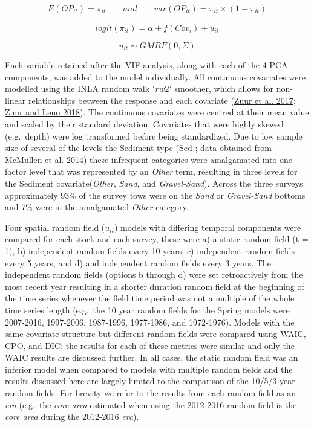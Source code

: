 \documentclass[
]{article}
\begin{document}
\begin{align}
E(OP_{it}) = \pi_{it} \qquad and \qquad var(OP_{it}) = \pi_{it} \times (1-\pi_{it})
\end{align}

\[ logit(\pi_{it}) = \alpha + f(Cov_{i}) + u_{it} \]

\[ u_{it} \sim GMRF(0,\Sigma) \]

Each variable retained after the VIF analysis, along with each of the 4 PCA components, was added to the model individually. All continuous covariates were modelled using the INLA random walk \('rw2'\) smoother, which allows for non-linear relationships between the response and each covariate (\protect\hyperlink{ref-zuurBeginnerGuideSpatial2017}{Zuur et al. 2017}; \protect\hyperlink{ref-zuurBeginnerGuideSpatial2018}{Zuur and Leno 2018}). The continuous covariates were centred at their mean value and scaled by their standard deviation. Covariates that were highly skewed (e.g.~depth) were log transformed before being standardized. Due to low sample size of several of the levels the Sediment type (Sed ; data obtained from \protect\hyperlink{ref-mcmullen2014GISData2014}{McMullen et al. 2014}) these infrequent categories were amalgamated into one factor level that was represented by an \emph{Other} term, resulting in three levels for the Sediment covariate(\emph{Other}, \emph{Sand}, and \emph{Gravel-Sand}). Across the three surveys approximately 93\% of the survey tows were on the \emph{Sand} or \emph{Gravel-Sand} bottoms and 7\% were in the amalgamated \emph{Other} category.

Four spatial random field (\(u_{it}\)) models with differing temporal components were compared for each stock and each survey, these were a) a static random field (t = 1), b) independent random fields every 10 years, c) independent random fields every 5 years, and d) and independent random fields every 3 years. The independent random fields (options b through d) were set retroactively from the most recent year resulting in a shorter duration random field at the beginning of the time series whenever the field time period was not a multiple of the whole time series length (e.g.~the 10 year random fields for the Spring models were 2007-2016, 1997-2006, 1987-1996, 1977-1986, and 1972-1976). Models with the same covariate structure but different random fields were compared using WAIC, CPO, and DIC; the results for each of these metrics were similar and only the WAIC results are discussed further. In all cases, the static random field was an inferior model when compared to models with multiple random fields and the results discussed here are largely limited to the comparison of the 10/5/3 year random fields. For brevity we refer to the results from each random field as an \emph{era} (e.g.~the \emph{core area} estimated when using the 2012-2016 random field is the \emph{core area} during the 2012-2016 \emph{era}).
\end{document}
